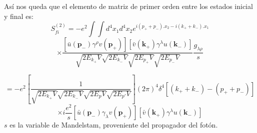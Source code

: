 Así nos queda que el elemento de matriz de primer orden entre los estados inicial y final es:
\[
 S^{(2)}_{fi}=-e^2 \int \int d^4x_1d^4x_2 e^{i(p_{+}+p_{-}).x_2-i(k_{+}+k_{-}).x_1}
\]
\[
\times \frac{[\bar{u}(\mathbf{p_-})\gamma^{\rho} v(\mathbf{p_+})][\bar{v}(\mathbf{k_+})\gamma^{\lambda}u(\mathbf{k_-})]}{\sqrt{2E_{k_+} V}\sqrt{2E_{k_-} V}\sqrt{2E_{p_{+}} V}\sqrt{2E_{p_{-}} V}}\frac{g_{\lambda \rho}}{s}
\]

\[
=-e^2\left[\frac{1}{\sqrt{2E_{k_+} V}\sqrt{2E_{k_-} V}\sqrt{2E_p V}\sqrt{2E_{p'}V}} \right](2\pi)^4 \delta^4[(k_+ +k_-)-(p_+ +p_-)]
\]
\begin{equation}
\times i\frac{e^2}{s}[\bar{u}(\mathbf{p_-})\gamma_{\lambda} v(\mathbf{p_+})][\bar{v}(\mathbf{k_+})\gamma^{\lambda}u(\mathbf{k_-})]
\end{equation}
$s$ es la variable de Mandelstam, proveniente del propagador del fotón.



